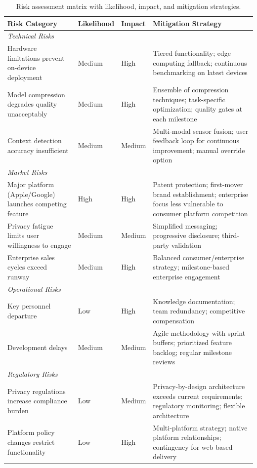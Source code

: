 \documentclass[11pt]{article}
\begin{document}
\begin{table}[t]
\centering
\caption{Risk assessment matrix with likelihood, impact, and mitigation strategies.}
\small
\begin{tabular}{p{3.5cm}p{1.5cm}p{1.5cm}p{9cm}}
\toprule
\textbf{Risk Category} & \textbf{Likelihood} & \textbf{Impact} & \textbf{Mitigation Strategy} \\
\midrule
\multicolumn{4}{l}{\textit{Technical Risks}} \\
Hardware limitations prevent on-device deployment & Medium & High & Tiered functionality; edge computing fallback; continuous benchmarking on latest devices \\
Model compression degrades quality unacceptably & Medium & High & Ensemble of compression techniques; task-specific optimization; quality gates at each milestone \\
Context detection accuracy insufficient & Medium & Medium & Multi-modal sensor fusion; user feedback loop for continuous improvement; manual override option \\
\midrule
\multicolumn{4}{l}{\textit{Market Risks}} \\
Major platform (Apple/Google) launches competing feature & High & High & Patent protection; first-mover brand establishment; enterprise focus less vulnerable to consumer platform competition \\
Privacy fatigue limits user willingness to engage & Medium & Medium & Simplified messaging; progressive disclosure; third-party validation \\
Enterprise sales cycles exceed runway & Medium & High & Balanced consumer/enterprise strategy; milestone-based enterprise engagement \\
\midrule
\multicolumn{4}{l}{\textit{Operational Risks}} \\
Key personnel departure & Low & High & Knowledge documentation; team redundancy; competitive compensation \\
Development delays & Medium & Medium & Agile methodology with sprint buffers; prioritized feature backlog; regular milestone reviews \\
\midrule
\multicolumn{4}{l}{\textit{Regulatory Risks}} \\
Privacy regulations increase compliance burden & Low & Medium & Privacy-by-design architecture exceeds current requirements; regulatory monitoring; flexible architecture \\
Platform policy changes restrict functionality & Low & High & Multi-platform strategy; native platform relationships; contingency for web-based delivery \\
\bottomrule
\end{tabular}
\label{tab:risks}
\end{table}
\end{document}
